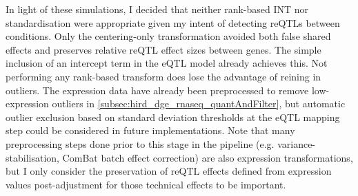 In light of these simulations, I decided that neither rank-based \gls{INT} nor standardisation were appropriate given my intent of detecting \glspl{reQTL} between conditions.
Only the centering-only transformation avoided both false shared effects and preserves relative \gls{reQTL} effect sizes between genes.
The simple inclusion of an intercept term in the \gls{eQTL} model already achieves this.
Not performing any rank-based transform does lose the advantage of reining in outliers.
The expression data have already been preprocessed to remove low-expression outliers in \cref{subsec:hird_dge_rnaseq_quantAndFilter}, 
but automatic outlier exclusion based on standard deviation thresholds at the \gls{eQTL} mapping step could be considered in future implementations\autocite{vosa2018UnravelingPolygenicArchitecture}.
Note that many preprocessing steps done prior to this stage in the pipeline (e.g. variance-stabilisation, ComBat batch effect correction) are also expression transformations,
but I only consider the preservation of \gls{reQTL} effects defined from expression values post-adjustment for those technical effects to be important.

